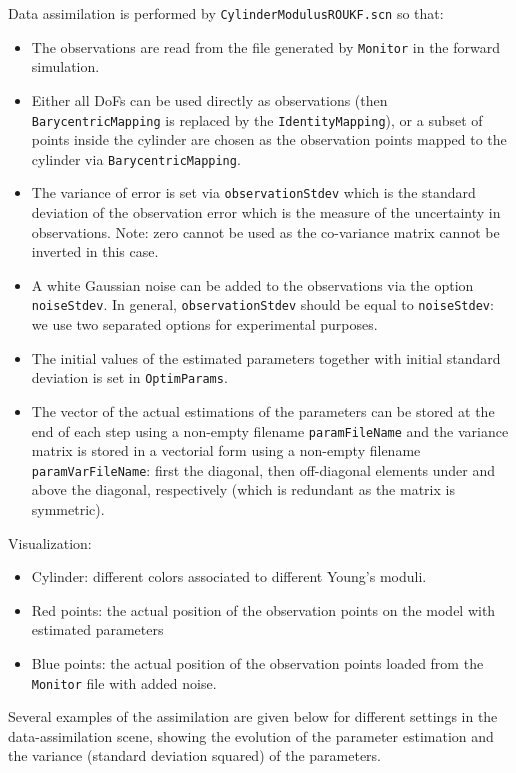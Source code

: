 \documentclass[10pt]{article}
\begin{document}
Data assimilation is performed by \texttt{CylinderModulusROUKF.scn} so that:
\begin{itemize}
 \item The observations are read from the file generated by \texttt{Monitor} in the forward simulation. 
 \item Either all DoFs can be used directly as observations (then \texttt{BarycentricMapping} is replaced by the \texttt{IdentityMapping}), or 
 a subset of points inside the cylinder are chosen as the observation points mapped to the cylinder via \texttt{BarycentricMapping}.
 \item The variance of error is set via \texttt{observationStdev} which is the standard deviation of the observation error which is the measure of the
uncertainty in observations. Note: zero cannot be used as the co-variance matrix cannot be inverted in this case.
 \item A white Gaussian noise can be added to the observations via the option \texttt{noiseStdev}. In general, \texttt{observationStdev} should be
equal to \texttt{noiseStdev}: we use two separated options for experimental purposes.
 \item The initial values of the estimated parameters together with initial standard deviation is set in \texttt{OptimParams}.
 \item The vector of the actual estimations of the parameters can be stored at the end of each step using a non-empty filename \texttt{paramFileName}
and the variance matrix is stored in a vectorial 
 form using a non-empty filename \texttt{paramVarFileName}: first the diagonal, then off-diagonal elements under and above the diagonal, respectively
(which is redundant as the matrix is symmetric). 
 \end{itemize}
 

 Visualization:
 \begin{itemize}
  \item Cylinder: different colors associated to different Young's moduli. 
  \item Red points: the actual position of the observation points on the model with estimated parameters  
  \item Blue points: the actual position of the observation points loaded from the \texttt{Monitor} file with added noise.
 \end{itemize}
 

Several examples of the assimilation are given below for different settings in the data-assimilation scene, showing the evolution of the parameter
estimation and the variance (standard deviation squared) of the 
parameters.
\end{document}
